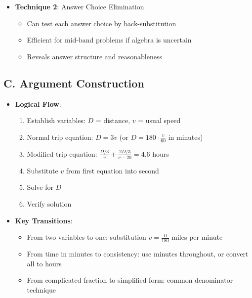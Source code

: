\documentclass[11pt]{article}
\begin{document}
\begin{tacticalbox}
\begin{itemize}[leftmargin=*]
    \item \textbf{Technique 2}: Answer Choice Elimination
    \begin{itemize}[leftmargin=*]
        \item Can test each answer choice by back-substitution
        \item Efficient for mid-band problems if algebra is uncertain
        \item Reveals answer structure and reasonableness
    \end{itemize}
\end{itemize}

\subsection*{C. Argument Construction}
\begin{itemize}[leftmargin=*]
    \item \textbf{Logical Flow}:
    \begin{enumerate}[leftmargin=*]
        \item Establish variables: $D$ = distance, $v$ = usual speed
        \item Normal trip equation: $D = 3v$ (or $D = 180 \cdot \frac{v}{60}$ in minutes)
        \item Modified trip equation: $\frac{D/3}{v} + \frac{2D/3}{v-20} = 4.6$ hours
        \item Substitute $v$ from first equation into second
        \item Solve for $D$
        \item Verify solution
    \end{enumerate}
    
    \item \textbf{Key Transitions}:
    \begin{itemize}[leftmargin=*]
        \item From two variables to one: substitution $v = \frac{D}{180}$ miles per minute
        \item From time in minutes to consistency: use minutes throughout, or convert all to hours
        \item From complicated fraction to simplified form: common denominator technique
    \end{itemize}
\end{itemize}
\end{tacticalbox}
\end{document}
